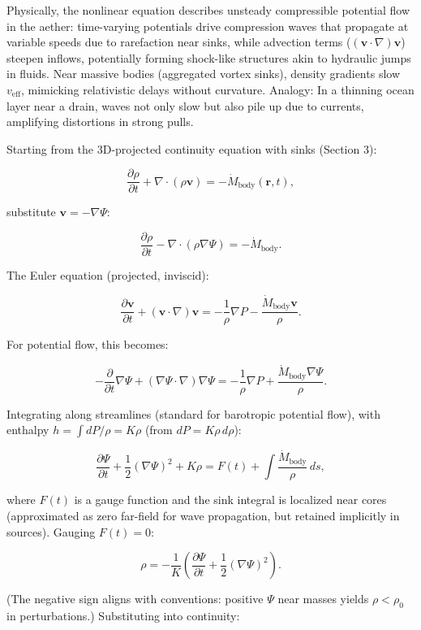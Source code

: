 \documentclass{article}
\begin{document}
Physically, the nonlinear equation describes unsteady compressible potential flow in the aether: time-varying potentials drive compression waves that propagate at variable speeds due to rarefaction near sinks, while advection terms ($( \mathbf{v} \cdot \nabla ) \mathbf{v}$) steepen inflows, potentially forming shock-like structures akin to hydraulic jumps in fluids. Near massive bodies (aggregated vortex sinks), density gradients slow $v_{\text{eff}}$, mimicking relativistic delays without curvature. Analogy: In a thinning ocean layer near a drain, waves not only slow but also pile up due to currents, amplifying distortions in strong pulls.

Starting from the 3D-projected continuity equation with sinks (Section 3):

\[
\frac{\partial \rho}{\partial t} + \nabla \cdot (\rho \mathbf{v}) = -\dot{M}_{\text{body}}(\mathbf{r}, t),
\]

substitute $\mathbf{v} = -\nabla \Psi$:

\[
\frac{\partial \rho}{\partial t} - \nabla \cdot (\rho \nabla \Psi) = -\dot{M}_{\text{body}}.
\]

The Euler equation (projected, inviscid):

\[
\frac{\partial \mathbf{v}}{\partial t} + (\mathbf{v} \cdot \nabla) \mathbf{v} = -\frac{1}{\rho} \nabla P - \frac{\dot{M}_{\text{body}} \mathbf{v}}{\rho}.
\]

For potential flow, this becomes:

\[
-\frac{\partial}{\partial t} \nabla \Psi + (\nabla \Psi \cdot \nabla) \nabla \Psi = -\frac{1}{\rho} \nabla P + \frac{\dot{M}_{\text{body}} \nabla \Psi}{\rho}.
\]

Integrating along streamlines (standard for barotropic potential flow), with enthalpy $h = \int dP / \rho = K \rho$ (from $dP = K \rho \, d\rho$):

\[
\frac{\partial \Psi}{\partial t} + \frac{1}{2} (\nabla \Psi)^2 + K \rho = F(t) + \int \frac{\dot{M}_{\text{body}}}{\rho} \, ds,
\]

where $F(t)$ is a gauge function and the sink integral is localized near cores (approximated as zero far-field for wave propagation, but retained implicitly in sources). Gauging $F(t) = 0$:

\[
\rho = -\frac{1}{K} \left( \frac{\partial \Psi}{\partial t} + \frac{1}{2} (\nabla \Psi)^2 \right).
\]

(The negative sign aligns with conventions: positive $\Psi$ near masses yields $\rho < \rho_0$ in perturbations.) Substituting into continuity:
\end{document}

